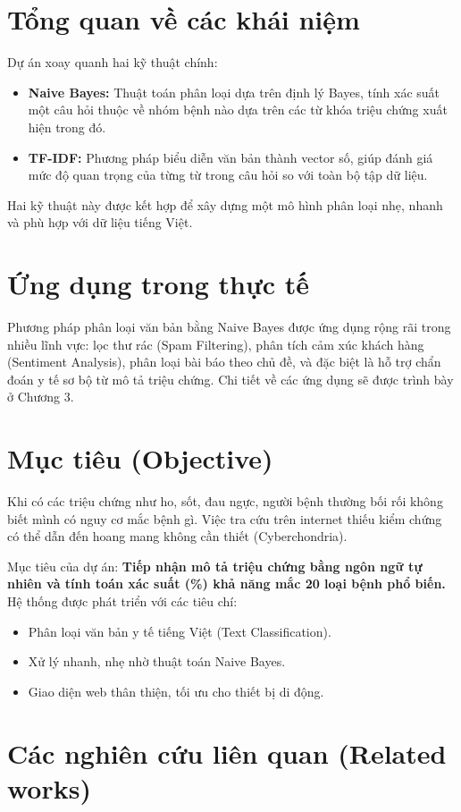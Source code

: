 \documentclass[12pt,a4paper]{report}
\begin{document}
\section{Tổng quan về các khái niệm}
Dự án xoay quanh hai kỹ thuật chính:
\begin{itemize}
    \item \textbf{Naive Bayes:} Thuật toán phân loại dựa trên định lý Bayes, tính xác suất một câu hỏi thuộc về nhóm bệnh nào dựa trên các từ khóa triệu chứng xuất hiện trong đó.
    \item \textbf{TF-IDF:} Phương pháp biểu diễn văn bản thành vector số, giúp đánh giá mức độ quan trọng của từng từ trong câu hỏi so với toàn bộ tập dữ liệu.
\end{itemize}
Hai kỹ thuật này được kết hợp để xây dựng một mô hình phân loại nhẹ, nhanh và phù hợp với dữ liệu tiếng Việt.

\section{Ứng dụng trong thực tế}
Phương pháp phân loại văn bản bằng Naive Bayes được ứng dụng rộng rãi trong nhiều lĩnh vực: lọc thư rác (Spam Filtering), phân tích cảm xúc khách hàng (Sentiment Analysis), phân loại bài báo theo chủ đề, và đặc biệt là hỗ trợ chẩn đoán y tế sơ bộ từ mô tả triệu chứng. Chi tiết về các ứng dụng sẽ được trình bày ở Chương 3.

\section{Mục tiêu (Objective)}
Khi có các triệu chứng như ho, sốt, đau ngực, người bệnh thường bối rối không biết mình có nguy cơ mắc bệnh gì. Việc tra cứu trên internet thiếu kiểm chứng có thể dẫn đến hoang mang không cần thiết (Cyberchondria).

Mục tiêu của dự án: \textbf{Tiếp nhận mô tả triệu chứng bằng ngôn ngữ tự nhiên và tính toán xác suất (\%) khả năng mắc 20 loại bệnh phổ biến.}
Hệ thống được phát triển với các tiêu chí:
\begin{itemize}
    \item Phân loại văn bản y tế tiếng Việt (Text Classification).
    \item Xử lý nhanh, nhẹ nhờ thuật toán Naive Bayes.
    \item Giao diện web thân thiện, tối ưu cho thiết bị di động.
\end{itemize}

\section{Các nghiên cứu liên quan (Related works)}
\end{document}
